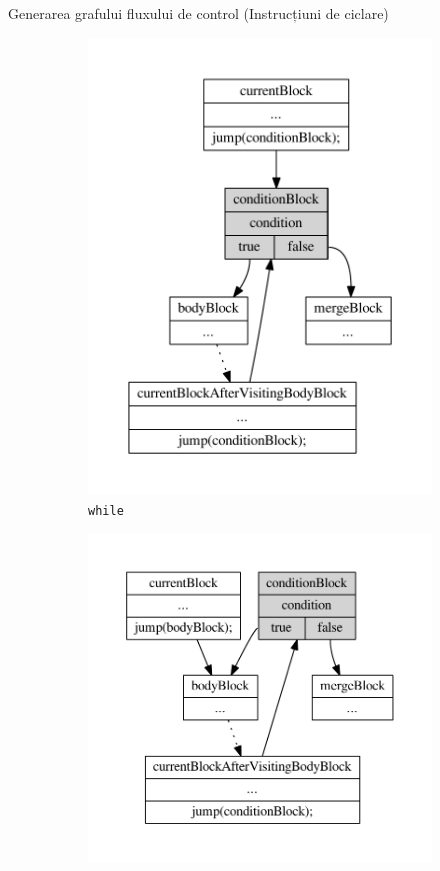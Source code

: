\documentclass{beamer}
\def\code#1{\texttt{#1}}
\begin{document}
\begin{frame}{Generarea grafului fluxului de control (Instrucțiuni de ciclare)}
\begin{figure}[htb]
\begin{subfigure}[b]{0.32\textwidth}
            \includegraphics[width=\textwidth]{../../../theses/diploma/src/graph/while.pdf}
            \caption{\code{while}}
        \end{subfigure}
        \hfill
        \begin{subfigure}[b]{0.32\textwidth}
            \centering
            \includegraphics[width=\textwidth]{../../../theses/diploma/src/graph/do-while.pdf}

\end{subfigure}
\end{figure}
\end{frame}
\end{document}
